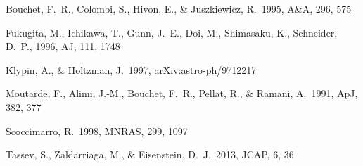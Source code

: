 \documentclass[5p,authoryear]{elsarticle}
\begin{document}
\begin{thebibliography}{99}

 Bouchet, F.~R., Colombi, S., Hivon, E., \& Juszkiewicz, R.\ 1995, A\&A, 296, 575 

  Fukugita, M., Ichikawa, T., Gunn, J.~E., Doi, M., Shimasaku, K.,  Schneider, D.~P., 1996, AJ, 111, 1748

 Klypin, A., \& Holtzman, J.\ 1997, arXiv:astro-ph/9712217 

 Moutarde, F., Alimi, 
J.-M., Bouchet, F.~R., Pellat, R., \& Ramani, A.\ 1991, ApJ, 382, 377 

 Scoccimarro, R.\ 1998, 
MNRAS, 299, 1097 

 Tassev, S., Zaldarriaga, 
M., \& Eisenstein, D.~J.\ 2013, JCAP, 6, 36 

\end{thebibliography}
\end{document}
